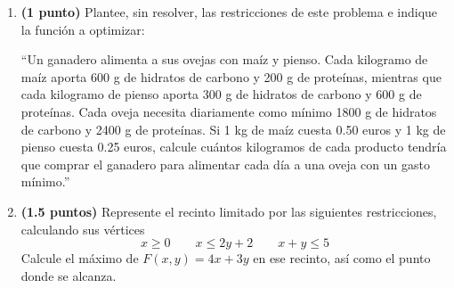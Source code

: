 
\begin{enumerate}[label=\alph*)]
\item \textbf{(1 punto)} Plantee, sin resolver, las restricciones de este problema e indique la función a optimizar:

``Un ganadero alimenta a sus ovejas con maíz y pienso. Cada kilogramo de maíz aporta 600 g de hidratos de carbono y 200 g de proteínas, mientras que cada kilogramo de pienso aporta 300 g de hidratos de carbono y 600 g de proteínas. Cada oveja necesita diariamente como mínimo 1800 g de hidratos de carbono y 2400 g de proteínas. Si 1 kg de maíz cuesta 0.50 euros y 1 kg de pienso cuesta 0.25 euros, calcule cuántos kilogramos de cada producto tendría que comprar el ganadero para alimentar cada día a una oveja con un gasto mínimo.''
\item \textbf{(1.5 puntos)} Represente el recinto limitado por las siguientes restricciones, calculando sus vértices
\[
x\geq0\qquad x\leq2y+2\qquad x+y\leq5
\]
Calcule el máximo de $F(x,y)=4x+3y$ en ese recinto, así como el punto donde se alcanza.
\end{enumerate}
